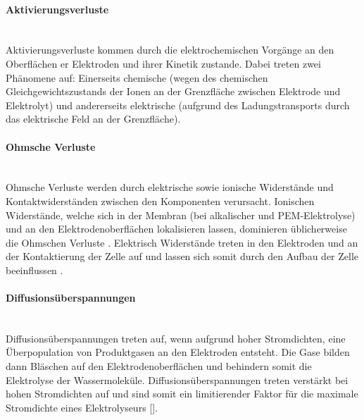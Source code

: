 \paragraph{Aktivierungsverluste} \ \\
Aktivierungsverluste kommen durch die elektrochemischen Vorgänge an den Oberflächen er Elektroden und ihrer Kinetik zustande. Dabei treten zwei Phänomene auf:  Einerseits chemische (wegen des chemischen Gleichgewichtszustands der Ionen an der Grenzfläche zwischen Elektrode und Elektrolyt) und andererseits elektrische (aufgrund des Ladungstransports durch das elektrische Feld an der Grenzfläche)\cite{Solid Oxide Electrolyzer Cell Modeling: A Review}.\\

\paragraph{Ohmsche Verluste} \ \\
Ohmsche Verluste werden durch elektrische sowie ionische Widerstände und Kontaktwiderständen zwischen den Komponenten verursacht. Ionischen Widerstände, welche sich in der Membran (bei alkalischer und PEM-Elektrolyse) und an den Elektrodenoberflächen lokalisieren lassen, dominieren üblicherweise die Ohmschen Verluste \cite{Solid Oxide Electrolyzer Cell Modeling: A Review}. Elektrisch Widerstände treten in den Elektroden und an der Kontaktierung der Zelle auf und lassen sich somit durch den Aufbau der Zelle beeinflussen \cite{ISBN 978-3-95806-217-7}.\\

\paragraph{Diffusionsüberspannungen}\ \\
Diffusionsüberspannungen treten auf, wenn aufgrund hoher Stromdichten, eine Überpopulation von Produktgasen an den Elektroden entsteht. Die Gase bilden dann Bläschen auf den Elektrodenoberflächen und behindern somit die Elektrolyse der Wassermoleküle. Diffusionsüberspannungen treten verstärkt bei hohen Stromdichten auf und sind somit ein limitierender Faktor für die maximale Stromdichte eines Elektrolyseurs [\cite{A semiempirical study of the temperature dependence
of the anode charge transfer coefficient of a 6 kW PEM
electrolyzer}].\\

